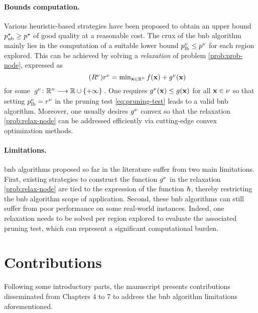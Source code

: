 \documentclass[11pt]{article}
\begin{document}
\paragraph{Bounds computation.}
Various heuristic-based strategies have been proposed to obtain an upper bound $p_{\text{ub}}^{\star} \geq p^{\star}$ of good quality at a reasonable cost.
The crux of the \gls{bnb} algorithm mainly lies in the computation of a suitable lower bound $p_{\text{lb}}^\nu \leq p^\nu$ for each region explored.
This can be achieved by solving a \emph{relaxation} of problem \eqref{prob:prob-node}, expressed as
\begin{equation}
    \label{prob:relax-node}
    \tag{$\node{\rpb}$}
    \textstyle
    \node{\robj} = \min_{\pv \in \kR^{\pdim}} \lfunc(\pv) + \node{\rfunc}(\pv)
\end{equation}
for some $\kfuncdef{\node{\rfunc}}{\kR^{\pdim}}{\kR \cup \{+\infty\}}$.
One requires $g^\nu(\mathbf{x}) \leq g(\mathbf{x})$ for all $\mathbf{x} \in \nu$ so that setting $p_{\text{lb}}^\nu = r^\nu$ in the pruning test \eqref{eq:pruning-test} leads to a valid \gls{bnb} algorithm.
Moreover, one usually desires $g^\nu$ convex so that the relaxation \eqref{prob:relax-node} can be addressed efficiently via cutting-edge convex optimization methods.

\paragraph{Limitations.}
\gls{bnb} algorithms proposed so far in the literature suffer from two main limitations.
First, existing strategies to construct the function $g^\nu$ in the relaxation \eqref{prob:relax-node} are tied to the expression of the function $h$, thereby restricting the \gls{bnb} algorithm scope of application.
Second, these \gls{bnb} algorithms can still suffer from poor performance on some real-world instances.
Indeed, one relaxation needs to be solved per region explored to evaluate the associated pruning test, which can represent a significant computational burden.


\section{Contributions}
\label{sec:contributions}

Following some introductory parts, the manuscript presents contributions disseminated from Chapters 4 to 7 to address the \gls{bnb} algorithm limitations aforementioned.
\end{document}

